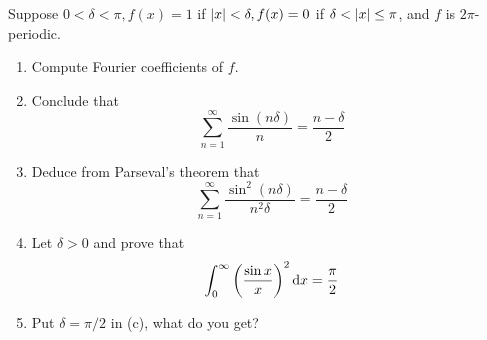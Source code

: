 \documentclass[a4paper, 12pt]{article}
\begin{document}
\begin{problem} 
    Suppose $0 < \delta < \pi, f(x) = 1$ if $\lvert x\rvert < \delta, f(x) = 0$ if $\delta < \lvert x\rvert \leq \pi$, and $f$ is $2\pi$-periodic. 
    \begin{enumerate}
    \item Compute Fourier coefficients of $f$.
    \item Conclude that \begin{equation*}
    \sum_{n=1}^{\infty} \frac{\sin (n\delta)}{n} = \frac{n - \delta}{2}
    \end{equation*}
    \item Deduce from Parseval's theorem that \begin{equation*}
    \sum_{n=1}^{\infty} \frac{\sin^2(n\delta)}{n^2\delta} = \frac{n - \delta}{2}
    \end{equation*}
    \item Let $\delta > 0$ and prove that \begin{equation*}
    \int_{0}^{\infty} \left(\frac{\sin x}{x}\right)^2 \mathrm{d} x = \frac{\pi}{2}
    \end{equation*}
    \item Put $\delta = \pi/2$ in (c), what do you get?
    \end{enumerate}
\end{problem}
\end{document}
